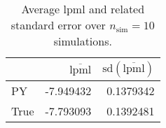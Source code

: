 \begin{table}[H]

\caption{Average lpml and related standard error over $n_{\text{sim}} = 10$ simulations.}
\centering
\begin{tabular}[t]{lrr}
\toprule
  & $\overbar{\text{lpml}}$ & $\text{sd}(\overbar{\text{lpml}})$\\
\midrule
PY & -7.949432 & 0.1379342\\
True & -7.793093 & 0.1392481\\
\bottomrule
\end{tabular}
\end{table}